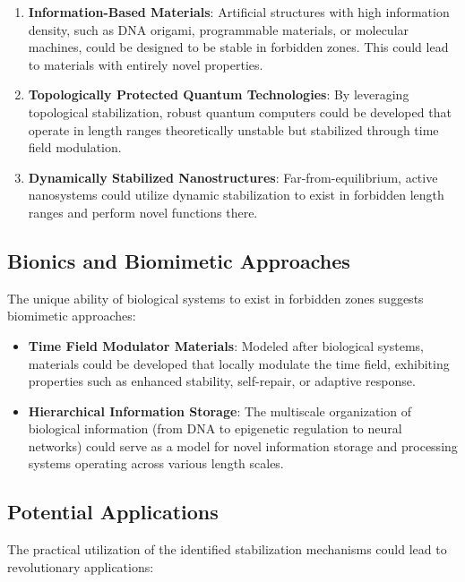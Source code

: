 \documentclass[12pt,a4paper]{article}
\begin{document}
	\begin{enumerate}
		\item \textbf{Information-Based Materials}: Artificial structures with high information density, such as DNA origami, programmable materials, or molecular machines, could be designed to be stable in forbidden zones. This could lead to materials with entirely novel properties.
		
		\item \textbf{Topologically Protected Quantum Technologies}: By leveraging topological stabilization, robust quantum computers could be developed that operate in length ranges theoretically unstable but stabilized through time field modulation.
		
		\item \textbf{Dynamically Stabilized Nanostructures}: Far-from-equilibrium, active nanosystems could utilize dynamic stabilization to exist in forbidden length ranges and perform novel functions there.
	\end{enumerate}
	
	\subsection{Bionics and Biomimetic Approaches}
	\label{subsec:bionik}
	
	The unique ability of biological systems to exist in forbidden zones suggests biomimetic approaches:
	
	\begin{itemize}
		\item \textbf{Time Field Modulator Materials}: Modeled after biological systems, materials could be developed that locally modulate the time field, exhibiting properties such as enhanced stability, self-repair, or adaptive response.
		
		\item \textbf{Hierarchical Information Storage}: The multiscale organization of biological information (from DNA to epigenetic regulation to neural networks) could serve as a model for novel information storage and processing systems operating across various length scales.
	\end{itemize}
	
	\subsection{Potential Applications}
	\label{subsec:potenzielle_anwendungen}
	
	The practical utilization of the identified stabilization mechanisms could lead to revolutionary applications:
	
\end{document}
